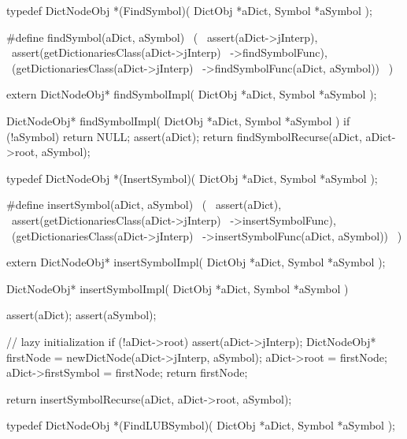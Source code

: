 \startTestSuite[findSymbol]

\startCHeader
typedef DictNodeObj *(FindSymbol)(
  DictObj *aDict,
  Symbol  *aSymbol
);

#define findSymbol(aDict, aSymbol)              \
  (                                             \
    assert(aDict->jInterp),                     \
    assert(getDictionariesClass(aDict->jInterp) \
      ->findSymbolFunc),                        \
    (getDictionariesClass(aDict->jInterp)       \
      ->findSymbolFunc(aDict, aSymbol))         \
  )
\stopCHeader

\setCHeaderStream{private}
\startCHeader
extern DictNodeObj* findSymbolImpl(
  DictObj *aDict,
  Symbol  *aSymbol
);
\stopCHeader
\setCHeaderStream{public}

\startCCode
DictNodeObj* findSymbolImpl(
  DictObj *aDict,
  Symbol  *aSymbol
) {
  if (!aSymbol) return NULL;
  assert(aDict);
  return findSymbolRecurse(aDict, aDict->root, aSymbol);
}
\stopCCode
\stopTestSuite

\startTestSuite[insertSymbol]

\startCHeader
typedef DictNodeObj *(InsertSymbol)(
  DictObj *aDict,
  Symbol  *aSymbol
);

#define insertSymbol(aDict, aSymbol)            \
  (                                             \
    assert(aDict),                              \
    assert(getDictionariesClass(aDict->jInterp) \
      ->insertSymbolFunc),                      \
    (getDictionariesClass(aDict->jInterp)       \
      ->insertSymbolFunc(aDict, aSymbol))       \
  )
\stopCHeader

\startCHeader
extern DictNodeObj* insertSymbolImpl(
  DictObj *aDict,
  Symbol  *aSymbol
);
\stopCHeader
\setCHeaderStream{public}

\startCCode
DictNodeObj* insertSymbolImpl(
  DictObj *aDict,
  Symbol  *aSymbol
) {
  assert(aDict);
  assert(aSymbol);

  // lazy initialization
  if (!aDict->root) {
    assert(aDict->jInterp);
    DictNodeObj* firstNode = newDictNode(aDict->jInterp, aSymbol);
    aDict->root            = firstNode;
    aDict->firstSymbol     = firstNode;
    return firstNode;
  }

  return insertSymbolRecurse(aDict, aDict->root, aSymbol);
}
\stopCCode
\stopTestSuite

\startTestSuite[findLUBSymbol]
\startCHeader
typedef DictNodeObj *(FindLUBSymbol)(
  DictObj *aDict,
  Symbol  *aSymbol
);

